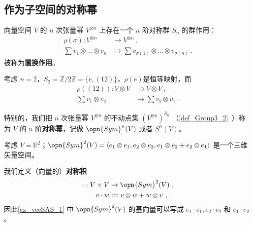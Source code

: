 
\begin{issues}
\issueTODO
{}
\end{issues}


\subsection{作为子空间的对称幂}

向量空间 $V$ 的 $n$ 次张量幂 $V^{\otimes n}$ 上存在一个 $n$ 阶对称群 $S_n$ 的群作用：
\begin{equation}
\begin{aligned}
\rho(\sigma): V^{\otimes n} &\to V^{\otimes n}~, \\
\sum v_1 \otimes \dots \otimes v_n &\mapsto \sum v_{\sigma(1)} \otimes \dots \otimes v_{\sigma(n)}~.
\end{aligned}
\end{equation}
被称为\textbf{置换作用}。

\begin{example}{}
考虑 $n = 2$，$S_2 = \mathbb{Z}/2\mathbb{Z} = \{e, (1 2)\}$，$\rho(e)$是恒等映射，而
\begin{equation}
\begin{aligned}
\rho((1 2)): V \otimes V &\to V \otimes V~, \\
\sum v_1 \otimes v_2 &\mapsto \sum v_2 \otimes v_1~.
\end{aligned}
\end{equation}
\end{example}

特别的，我们把 $n$ 次张量幂 $V^{\otimes n}$ 的不动点集 $(V^{\otimes n})^{S_n}$ （\autoref{def_Group3_2}~）称为 $V$ 的 $n$ 阶\textbf{对称幂}，记做 $\opn{Sym}^n(V)$ 或者 $S^n(V)$。

\begin{example}{}\label{ex_vecSAS_1}
考虑 $V = \mathbb{R}^2$；$\opn{Sym}^2(V) = \langle e_1 \otimes e_1, e_2 \otimes e_2, e_1 \otimes e_2 + e_2 \otimes e_1 \rangle$ 是一个三维矢量空间。
\end{example}

我们定义（向量的）\textbf{对称积}
\begin{equation}
\begin{aligned}
\cdot: V \times V &\to \opn{Sym}^2(V)~, \\
v \cdot w &:= v \otimes w + w \otimes v~,
\end{aligned}
\end{equation}
因此\autoref{ex_vecSAS_1} 中 $\opn{Sym}^2(V)$ 的基向量可以写成 $e_1 \cdot e_1, e_2 \cdot e_2$ 和 $e_1 \cdot e_2$。


